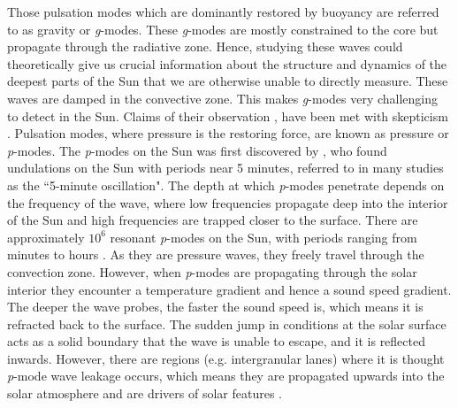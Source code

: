 %
Those pulsation modes which are dominantly restored by buoyancy are referred to as gravity or \textit{g}-modes. These \textit{g}-modes are mostly constrained to the core but propagate through the radiative zone. Hence, studying these waves could theoretically give us crucial information about the structure and dynamics of the deepest parts of the Sun that we are otherwise unable to directly measure. These waves are damped in the convective zone. This makes \textit{g}-modes very challenging to detect in the Sun. Claims of their observation \citep{Garc2007Sci3161591G, Fossat2017AA604A40F, Fossat2018AA612L1F}, have been met with skepticism \citep{Appourchaux2010AARv18197A, Schunker2018SoPh29395S,Appourchaux2019AA624A106A, Scherrer2019ApJ87742S}. \np
%
Pulsation modes, where pressure is the restoring force, are known as pressure or \textit{p}-modes. The \textit{p}-modes on the Sun was first discovered by \cite{Leighton1962ApJ135474L}, who found undulations on the Sun with periods near 5 minutes, referred to in many studies as the ``5-minute oscillation". The depth at which \textit{p}-modes penetrate depends on the frequency of the wave, where low frequencies propagate deep into the interior of the Sun and high frequencies are trapped closer to the surface. There are approximately $10^6$ resonant \textit{p}-modes on the Sun, with periods ranging from minutes to hours \citep{Demarque1999PNAS965356D}. As they are pressure waves, they freely travel through the convection zone. However, when \textit{p}-modes are propagating through the solar interior they encounter a temperature gradient and hence a sound speed gradient. The deeper the wave probes, the faster the sound speed is, which means it is refracted back to the surface. The sudden jump in conditions at the solar surface acts as a solid boundary that the wave is unable to escape, and it is reflected inwards. However, there are regions (e.g. intergranular lanes) where it is thought \textit{p}-mode wave leakage occurs, which means they are propagated upwards into the solar atmosphere and are drivers of solar features \citep{Suematsu1990LNP367211S, Pontieu2004Natur, Pontieu2005ApJ624L61D, Heggland2007ApJ6661277H, Pontieu2004Natur}.
